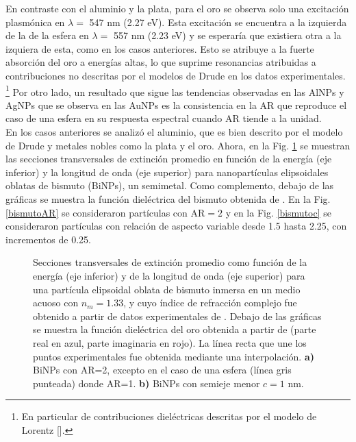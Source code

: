 En contraste con el aluminio y la plata, para el oro se observa solo una excitación plasmónica en $\lambda=$ 547 nm (2.27 eV). Esta excitación se encuentra a la izquierda de la de la esfera en $\lambda=$ 557 nm (2.23 eV) y se esperaría que existiera otra a la izquiera de esta, como en los casos anteriores. Esto se atribuye a la fuerte absorción del oro a energías altas, lo que suprime resonancias atribuidas a contribuciones no descritas por el modelos de Drude en los datos experimentales. \footnote{En particular de contribuciones dieléctricas descritas por el modelo de Lorentz [\cite{Plasmonics}].} Por otro lado, un resultado que sigue las tendencias observadas en las AlNPs y AgNPs que se observa en las AuNPs es la consistencia en la AR que reproduce el caso de una esfera en su respuesta espectral cuando AR tiende a la unidad. \\

En los casos anteriores se analizó el aluminio, que es bien descrito por el modelo de Drude y metales nobles como la plata y el oro. Ahora, en la Fig. \ref{bismuto} se muestran las secciones transversales de extinción promedio en función de la energía (eje inferior) y la longitud de onda (eje superior) para nanopartículas elipsoidales oblatas de bismuto (BiNPs), un semimetal. Como complemento, debajo de las gráficas se muestra la función dieléctrica del bismuto obtenida de \cite{Bismuto}. En la Fig. \ref{bismutoAR} se consideraron partículas con  AR$=2$  y en la Fig. \ref{bismutoc} se consideraron partículas con relación de aspecto variable desde 1.5 hasta 2.25, con incrementos de 0.25. 

\begin{figure}[H]
	\quad%
	\caption{Secciones transversales de extinción promedio  como función de la energía (eje inferior) y de la longitud de onda (eje superior) para una partícula elipsoidal oblata de bismuto inmersa en un medio acuoso con $n_m=1.33$, y cuyo índice de refracción complejo fue obtenido a partir de datos experimentales de \cite{Bismuto}. Debajo de las gráficas se muestra la función dieléctrica del oro obtenida a partir de \cite{Plata} (parte real en azul, parte imaginaria en rojo). La línea recta que une los puntos experimentales fue obtenida mediante una interpolación. \textbf{a)} BiNPs con AR=2, excepto en el caso de una esfera (línea gris punteada) donde AR=1. \textbf{b)} BiNPs con semieje menor $c=1$ nm.}\label{bismuto}
\end{figure}

